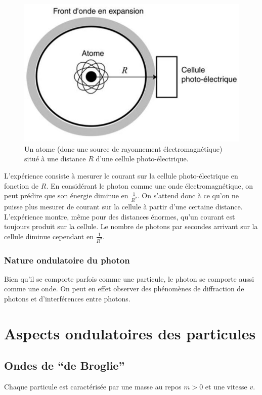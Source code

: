 \begin{figure}[ht!]
	\centering
	\includegraphics[scale=0.5]{exp_photon_2.jpg}
	\caption{Un atome (donc une source de rayonnement
	électromagnétique) situé à une distance $R$ d'une cellule
	photo-électrique.}
	\label{fig:exp-photon2}
\end{figure}

L'expérience consiste à mesurer le courant
sur la cellule photo-électrique en fonction de $R$.
En considérant le photon comme une onde électromagnétique,
on peut prédire que son énergie diminue en $\frac{1}{R^2}$. On s'attend
donc à ce qu'on ne puisse plus mesurer de courant sur
la cellule à partir d'une certaine distance.
L'expérience montre, même pour des distances énormes,
qu'un courant est toujours produit sur la cellule.
Le nombre de photons par secondes arrivant sur la cellule
diminue cependant en $\frac{1}{R^2}$.

\subsubsection{Nature ondulatoire du photon}
Bien qu'il se comporte parfois comme une particule,
le photon se comporte aussi comme une onde. On peut
en effet observer des phénomènes de diffraction de photons
et d'interférences entre photons.

\section{Aspects ondulatoires des particules}
\subsection{Ondes de ``de Broglie''}
Chaque particule est caractérisée par une masse au repos $m > 0$
et une vitesse $v$.

